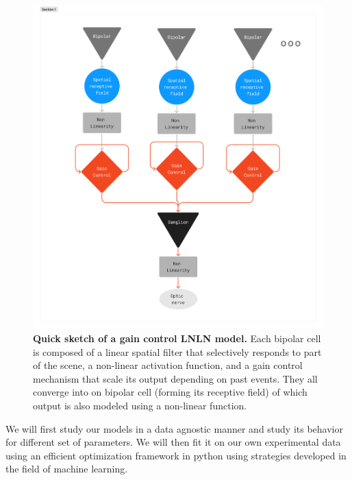 \begin{figure}
    \centering
    \includegraphics[scale = 0.2]{pics/GCModelDiagram.png}
    \caption{\textbf{Quick sketch of a gain control LNLN model.} Each bipolar
        cell is
        composed of a linear spatial filter that selectively responds to part
        of the scene,
        a non-linear activation function, and a gain control mechanism that
        scale its output
        depending on past events. They all converge into on bipolar cell
        (forming its receptive field)
        of which output is also modeled using a non-linear function.}
    \label{fig:LNLN}
\end{figure}
We will first study our models in a data agnostic manner and study its behavior
for different set of parameters. We will then fit it on our own experimental
data using an efficient optimization framework in python using strategies
developed in the field of machine learning.
